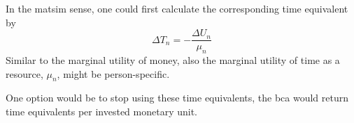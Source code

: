 In the \acrshort{matsim} sense, one could first calculate the corresponding time equivalent 
%
by
%
\begin{equation}
\label{eq:ch:economicEval:monetizationTime}
\Delta T_n =  - \frac{\Delta U_n}{\mu_n}
\end{equation}
%
Similar to the marginal utility of money, also the marginal utility of time as a resource, $\mu_n$, might be person-specific.
%

One option would be to stop using these time equivalents, \ie the \gls{bca} would return time equivalents per invested monetary unit.
 
